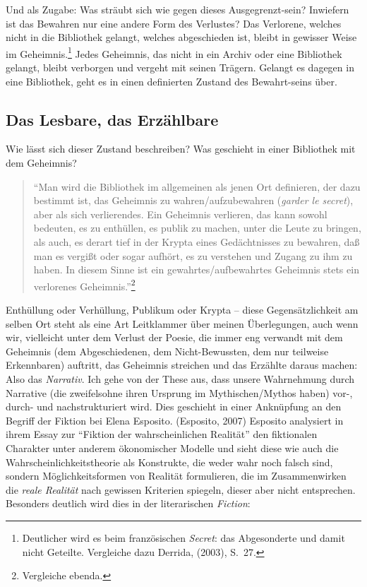 \documentclass[output=paper]{langscibook}
\begin{document}
Und als Zugabe: Was sträubt sich wie gegen dieses Ausgegrenzt-sein?
Inwiefern ist das Bewahren nur eine andere Form des Verlustes? Das
Verlorene, welches nicht in die Bibliothek gelangt, welches abgeschieden
ist, bleibt in gewisser Weise im Geheimnis.\footnote{Deutlicher wird es
  beim französischen \emph{Secret}: das Abgesonderte und damit nicht
  Geteilte. Vergleiche dazu Derrida, (2003), S.~27.} Jedes Geheimnis, das
nicht in ein Archiv oder eine Bibliothek gelangt, bleibt verborgen und
vergeht mit seinen Trägern. Gelangt es dagegen in eine Bibliothek, geht
es in einen definierten Zustand des Bewahrt-seins über.

\hypertarget{das-lesbare-das-erzuxe4hlbare}{%
\subsection*{Das Lesbare, das
Erzählbare}\label{das-lesbare-das-erzuxe4hlbare}}

Wie lässt sich dieser Zustand beschreiben? Was geschieht in einer
Bibliothek mit dem Geheimnis?

\begin{quote}
\enquote{Man wird die Bibliothek im allgemeinen als jenen Ort
definieren, der dazu bestimmt ist, das Geheimnis zu wahren/aufzubewahren
(\emph{garder le secret}), aber als sich verlierendes. Ein Geheimnis
verlieren, das kann sowohl bedeuten, es zu enthüllen, es publik zu
machen, unter die Leute zu bringen, als auch, es derart tief in der
Krypta eines Gedächtnisses zu bewahren, daß man es vergißt oder sogar
aufhört, es zu verstehen und Zugang zu ihm zu haben. In diesem Sinne ist
ein gewahrtes/aufbewahrtes Geheimnis stets ein verlorenes
Geheimnis.}\footnote{Vergleiche ebenda.}
\end{quote}

\noindent Enthüllung oder Verhüllung, Publikum oder Krypta -- diese
Gegensätzlichkeit am selben Ort steht als eine Art Leitklammer über
meinen Überlegungen, auch wenn wir, vielleicht unter dem Verlust der
Poesie, die immer eng verwandt mit dem Geheimnis (dem Abgeschiedenen,
dem Nicht-Bewussten, dem nur teilweise Erkennbaren) auftritt, das
Geheimnis streichen und das Erzählte daraus machen: Also das
\emph{Narrativ}. Ich gehe von der These aus, dass unsere Wahrnehmung
durch Narrative (die zweifelsohne ihren Ursprung im Mythischen/Mythos
haben) vor-, durch- und nachstrukturiert wird. Dies geschieht in einer
Anknüpfung an den Begriff der Fiktion bei Elena Esposito. (Esposito,
2007) Esposito analysiert in ihrem Essay zur \enquote{Fiktion der
wahrscheinlichen Realität} den fiktionalen Charakter unter anderem
ökonomischer Modelle und sieht diese wie auch die
Wahrscheinlichkeitstheorie als Konstrukte, die weder wahr noch falsch
sind, sondern Möglichkeitsformen von Realität formulieren, die im
Zusammenwirken die \emph{reale Realität} nach gewissen Kriterien
spiegeln, dieser aber nicht entsprechen. Besonders deutlich wird dies in
der literarischen \emph{Fiction}:
\end{document}
